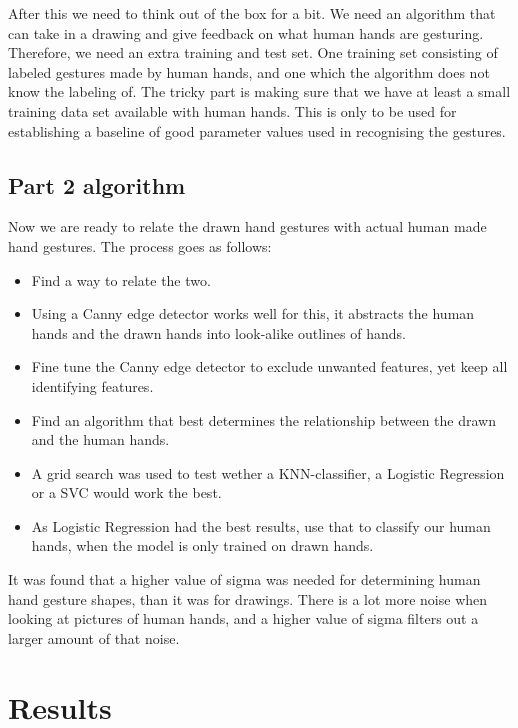 \documentclass[11pt,a4paper]{article}
\begin{document}
After this we need to think out of the box for a bit. We need an algorithm that can take in a drawing and give feedback on what human hands are gesturing. Therefore, we need an extra training and test set. One training set consisting of labeled gestures made by human hands, and one which the algorithm does not know the labeling of. The tricky part is making sure that we have at least a small training data set available with human hands. This is only to be used for establishing a baseline of good parameter values used in recognising the gestures.


\subsection{Part 2 algorithm}
\label{sec:part-2-algorithm}

Now we are ready to relate the drawn hand gestures with actual human made hand gestures. The process goes as follows:

\begin{itemize}
\item Find a way to relate the two.
\item Using a Canny edge detector works well for this, it abstracts the human hands and the drawn hands into look-alike outlines of hands.
\item Fine tune the Canny edge detector to exclude unwanted features, yet keep all identifying features.
\item Find an algorithm that best determines the relationship between the drawn and the human hands.
\item A grid search was used to test wether a KNN-classifier, a Logistic Regression or a SVC would work the best.
\item As Logistic Regression had the best results, use that to classify our human hands, when the model is only trained on drawn hands.
\end{itemize}

It was found that a higher value of sigma was needed for determining human hand gesture shapes, than it was for drawings. There is a lot more noise when looking at pictures of human hands, and a higher value of sigma filters out a larger amount of that noise.

\section{Results}
\label{sec:results}
\end{document}
